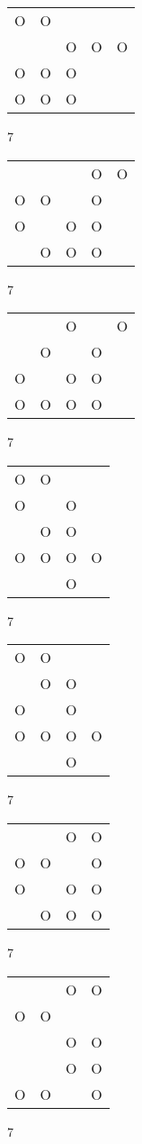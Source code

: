 \begin{tabular}{|m{0.2cm}m{0.2cm}m{0.2cm}m{0.2cm}m{0.2cm}|}\hline
O&O& & & \\
 & &O&O&O\\
O&O&O& & \\
O&O&O& & \\
\hline\end{tabular}7
\begin{tabular}{|m{0.2cm}m{0.2cm}m{0.2cm}m{0.2cm}m{0.2cm}|}\hline
 & & &O&O\\
O&O& &O& \\
O& &O&O& \\
 &O&O&O& \\
\hline\end{tabular}7
\begin{tabular}{|m{0.2cm}m{0.2cm}m{0.2cm}m{0.2cm}m{0.2cm}|}\hline
 & &O& &O\\
 &O& &O& \\
O& &O&O& \\
O&O&O&O& \\
\hline\end{tabular}7
\begin{tabular}{|m{0.2cm}m{0.2cm}m{0.2cm}m{0.2cm}|}\hline
O&O& & \\
O& &O& \\
 &O&O& \\
O&O&O&O\\
 & &O& \\
\hline\end{tabular}7
\begin{tabular}{|m{0.2cm}m{0.2cm}m{0.2cm}m{0.2cm}|}\hline
O&O& & \\
 &O&O& \\
O& &O& \\
O&O&O&O\\
 & &O& \\
\hline\end{tabular}7
\begin{tabular}{|m{0.2cm}m{0.2cm}m{0.2cm}m{0.2cm}|}\hline
 & &O&O\\
O&O& &O\\
O& &O&O\\
 &O&O&O\\
\hline\end{tabular}7
\begin{tabular}{|m{0.2cm}m{0.2cm}m{0.2cm}m{0.2cm}|}\hline
 & &O&O\\
O&O& & \\
 & &O&O\\
 & &O&O\\
O&O& &O\\
\hline\end{tabular}7
